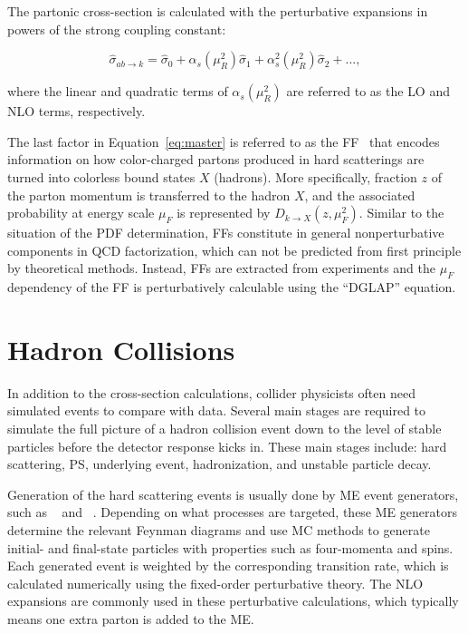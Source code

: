 The partonic cross-section is calculated with the perturbative expansions in powers of the strong coupling constant:

\begin{equation}
\label{eq:expand}
\hat{\sigma}_{ab\rightarrow k}=\hat{\sigma}_{0}+\alpha_{s}(\mu_{R}^2)\hat{\sigma}_{1}+\alpha_{s}^{2}(\mu_{R}^2)\hat{\sigma}_{2}+...,
\end{equation}

where the linear and quadratic terms of $\alpha_{s}(\mu_{R}^2)$ are referred to as the \ac{LO} and \ac{NLO} terms, respectively. 

The last factor in Equation~\ref{eq:master} is referred to as the \ac{FF}~\cite{Field:1976ve} that encodes information on how color-charged partons produced in hard scatterings are turned into colorless bound states $X$ (hadrons). More specifically, fraction $z$ of the parton momentum is transferred to the hadron $X$, and the associated probability at energy scale $\mu_{F}$ is represented by $D_{k\rightarrow X}(z,\mu_{F}^2)$. Similar to the situation of the \ac{PDF} determination, \acp{FF} constitute in general nonperturbative components in \ac{QCD} factorization, which can not be predicted from first principle by theoretical methods. Instead, \acp{FF} are extracted from experiments and the $\mu_F$ dependency of the \ac{FF} is perturbatively calculable using the ``DGLAP'' equation.

\section{Hadron Collisions}
\label{sec:Collision}

In addition to the cross-section calculations, collider physicists often need simulated events to compare with data. Several main stages are required to simulate the full picture of a hadron collision event down to the level of stable particles before the detector response kicks in. These main stages include: hard scattering, \ac{PS}, underlying event, hadronization, and unstable particle decay.

Generation of the hard scattering events is usually done by \ac{ME} event generators, such as \MG~\cite{Alwall:2014hca} and \Pow~\cite{Frixione:2007vw}. Depending on what processes are targeted, these \ac{ME} generators determine the relevant Feynman diagrams and use \ac{MC} methods to generate initial- and final-state particles with properties such as four-momenta and spins. Each generated event is weighted by the corresponding transition rate, which is calculated numerically using the fixed-order perturbative theory. The \ac{NLO} expansions are commonly used in these perturbative calculations, which typically means one extra parton is added to the \ac{ME}.

